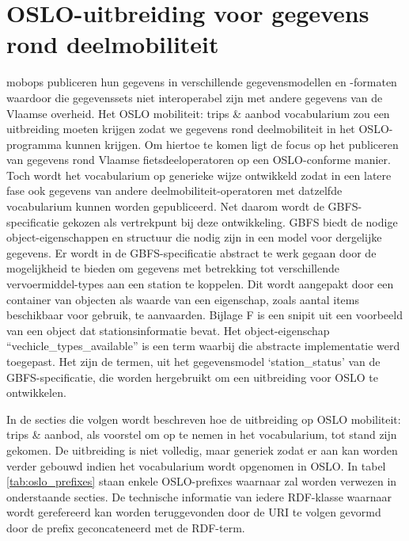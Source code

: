 \chapter{OSLO-uitbreiding voor gegevens rond deelmobiliteit}
\label{chap:ontologie_voor_fietsdeeloperatoren}
\Glspl{mobop} publiceren hun gegevens in verschillende gegevensmodellen en -formaten waardoor die gegevenssets niet interoperabel zijn met andere gegevens van de Vlaamse overheid. Het OSLO mobiliteit: trips \& aanbod vocabularium zou een uitbreiding moeten krijgen zodat we gegevens rond deelmobiliteit in het OSLO-programma kunnen krijgen.
Om hiertoe te komen ligt de focus op het publiceren van gegevens rond Vlaamse fietsdeeloperatoren op een OSLO-conforme manier. Toch wordt het vocabularium op generieke wijze ontwikkeld zodat in een latere fase ook gegevens van andere deelmobiliteit-operatoren met datzelfde vocabularium kunnen worden gepubliceerd.
Net daarom wordt de GBFS-specificatie gekozen als vertrekpunt bij deze ontwikkeling.
GBFS biedt de nodige object-eigenschappen en structuur die nodig zijn in een model voor dergelijke gegevens.
Er wordt in de GBFS-specificatie abstract te werk gegaan door de mogelijkheid te bieden om gegevens met betrekking tot verschillende vervoermiddel-types aan een station te koppelen. 
Dit wordt aangepakt door een container van objecten als waarde van een eigenschap, zoals aantal items beschikbaar voor gebruik, te aanvaarden.
Bijlage F is een snipit uit een voorbeeld van een object dat stationsinformatie bevat. Het object-eigenschap ``vechicle\_types\_available'' is een term waarbij die abstracte implementatie werd toegepast.
Het zijn de termen, uit het gegevensmodel `station\_status' van de GBFS-specificatie, die worden hergebruikt om een uitbreiding voor OSLO te ontwikkelen. 

In de secties die volgen wordt beschreven hoe de uitbreiding op OSLO mobiliteit: trips \& aanbod, als voorstel om op te nemen in het vocabularium, tot stand zijn gekomen. De uitbreiding is niet volledig, maar generiek zodat er aan kan worden verder gebouwd indien het vocabularium wordt opgenomen in OSLO.
In tabel \ref{tab:oslo_prefixes} staan enkele OSLO-prefixes waarnaar zal worden verwezen in onderstaande secties. De technische informatie van iedere RDF-klasse waarnaar wordt gerefereerd kan worden teruggevonden door de URI te volgen gevormd door de prefix geconcateneerd met de RDF-term.

